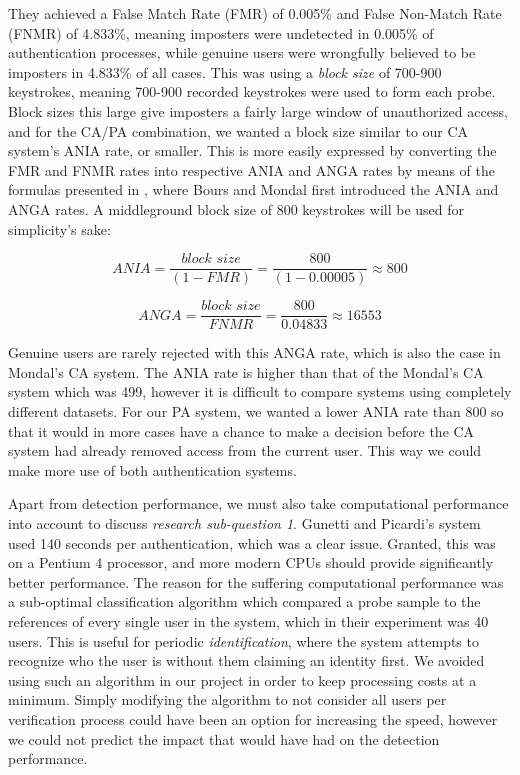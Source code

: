 They achieved a False Match Rate (FMR) of 0.005\% and False Non-Match Rate (FNMR) of 4.833\%, meaning imposters were undetected in 0.005\% of authentication processes, while genuine users were wrongfully believed to be imposters in 4.833\% of all cases. 
This was using a \textit{block size} of 700-900 keystrokes, meaning 700-900 recorded keystrokes were used to form each probe.
Block sizes this large give imposters a fairly large window of unauthorized access, and for the CA/PA combination, we wanted a block size similar to our CA system's ANIA rate, or smaller.
This is more easily expressed by converting the FMR and FNMR rates into respective ANIA and ANGA rates by means of the formulas presented in \cite{CA-performance}, where Bours and Mondal first introduced the ANIA and ANGA rates.
A middleground block size of 800 keystrokes will be used for simplicity's sake:

\begin{equation}
\textit{ANIA} = \frac{\textit{block size}}{(1-\textit{FMR})} = \frac{800}{(1-0.00005)} \approx 800
\end{equation}

\begin{equation}
\textit{ANGA} = \frac{\textit{block size}}{\textit{FNMR}} = \frac{800}{0.04833} \approx 16553
\end{equation}

Genuine users are rarely rejected with this ANGA rate, which is also the case in Mondal's \cite{mondal} CA system.
The ANIA rate is higher than that of the Mondal's CA system which was 499, however it is difficult to compare systems using completely different datasets.
For our PA system, we wanted a lower ANIA rate than 800 so that it would in more cases have a chance to make a decision before the CA system had already removed access from the current user.
This way we could make more use of both authentication systems.%

Apart from detection performance, we must also take computational performance into account to discuss \textit{research sub-question 1}.
Gunetti and Picardi's \cite{gnp} system used 140 seconds per authentication, which was a clear issue.
Granted, this was on a Pentium 4 processor, and more modern CPUs should provide significantly better performance.
The reason for the suffering computational performance was a sub-optimal classification algorithm which compared a probe sample to the references of every single user in the system, which in their experiment was 40 users.
This is useful for periodic \textit{identification}, where the system attempts to recognize who the user is without them claiming an identity first.
We avoided using such an algorithm in our project in order to keep processing costs at a minimum.
Simply modifying the algorithm to not consider all users per verification process could have been an option for increasing the speed, however we could not predict the impact that would have had on the detection performance.

